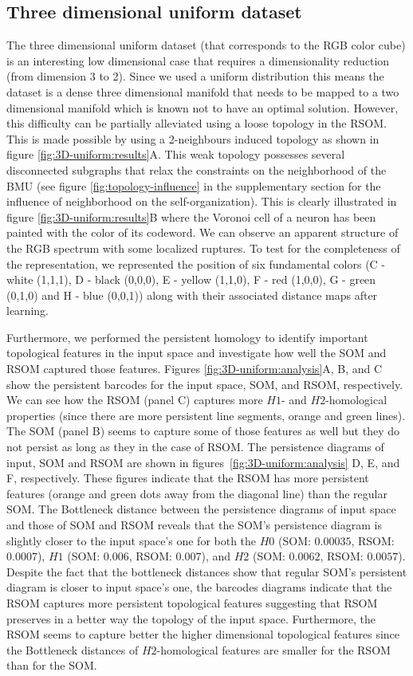 \subsection{Three dimensional uniform dataset}

The three dimensional uniform dataset (that corresponds to the RGB color cube) is an interesting low dimensional case that requires a dimensionality reduction (from dimension 3 to 2). Since we used a uniform distribution this means the dataset is a dense three dimensional manifold that needs to be mapped to a two dimensional manifold which is known not to have an optimal solution. However, this difficulty can be partially alleviated using a loose topology in the RSOM. This is made possible by using a 2-neighbours induced topology as shown in figure \ref{fig:3D-uniform:results}A. This weak topology possesses several disconnected subgraphs that relax the constraints on the neighborhood of the BMU (see figure \ref{fig:topology-influence} in the supplementary section for the influence of neighborhood on the self-organization). This is clearly illustrated in figure \ref{fig:3D-uniform:results}B where the Voronoi cell of a neuron has been painted with the color of its codeword. We can observe an apparent structure of the RGB spectrum with some localized ruptures. To test for the completeness of the representation, we represented the position of six fundamental colors (C - white (1,1,1), D - black (0,0,0), E - yellow (1,1,0), F - red (1,0,0), G - green (0,1,0) and H - blue (0,0,1)) along with their associated distance maps after learning.

Furthermore, we performed the persistent homology to identify important topological features in the
input space and investigate how well the SOM and RSOM captured those features. Figures
\ref{fig:3D-uniform:analysis}A, B, and C show the persistent barcodes for the input space, SOM, and 
RSOM, respectively. We can see how the RSOM (panel C) captures more $H1$- and $H2$-homological properties
(since there are more persistent line segments, orange and green lines). The SOM (panel B) seems to capture
some of those features as well but they do not persist as long as they in the case of RSOM. The persistence 
diagrams of input, SOM and RSOM are shown in figures~\ref{fig:3D-uniform:analysis} D, E, and F, respectively.
These figures indicate that the RSOM has more persistent features (orange and green dots away from the diagonal
line) than the regular SOM.
The Bottleneck distance between the persistence diagrams of input space and those of SOM and RSOM reveals
that the SOM's persistence diagram is slightly closer to the input space's one for both the $H0$ (SOM: $0.00035$,
RSOM: $0.0007$), $H1$ (SOM: $0.006$, RSOM: $0.007$), and $H2$ (SOM: $0.0062$, RSOM: $0.0057$). Despite the 
fact that the bottleneck distances show that 
regular SOM's persistent diagram is closer to input space's one, the barcodes diagrams indicate that the RSOM 
captures more persistent topological features suggesting that RSOM preserves in a better way the topology of the
input space. Furthermore, the RSOM seems to capture better the higher dimensional topological features since the 
Bottleneck distances of $H2$-homological features are smaller for the RSOM than for the SOM.

